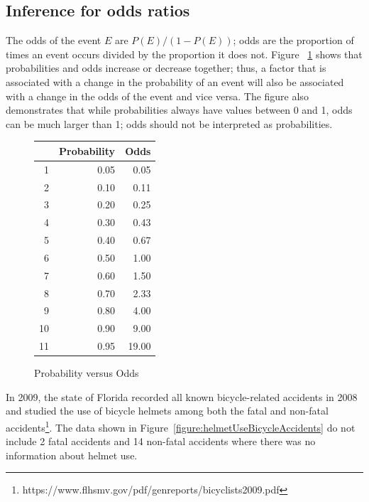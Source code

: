 \subsection{Inference for odds ratios}
\label{InferenceOddsRatios}

The odds of the event $E$ are $P(E)/(1 - P(E))$; odds are the proportion of times an event occurs divided by the proportion it does not.  Figure ~\ref{figure:probVsOdds} shows that probabilities and odds increase or decrease together; thus, a factor that is associated with a change in the probability of an event will also be associated with a change in the odds of the event and vice versa.  The figure also demonstrates that while probabilities always have values between 0 and 1, odds can be much larger than 1; odds should not be interpreted as probabilities.

\begin{figure}[ht]
\centering
\begin{tabular}{rrr}
  \hline
 & Probability & Odds \\ 
  \hline
1 & 0.05 & 0.05 \\ 
  2 & 0.10 & 0.11 \\ 
  3 & 0.20 & 0.25 \\ 
  4 & 0.30 & 0.43 \\ 
  5 & 0.40 & 0.67 \\ 
  6 & 0.50 & 1.00 \\ 
  7 & 0.60 & 1.50 \\ 
  8 & 0.70 & 2.33 \\ 
  9 & 0.80 & 4.00 \\ 
  10 & 0.90 & 9.00 \\ 
  11 & 0.95 & 19.00 \\ 
   \hline
\end{tabular}
\caption{Probability versus Odds} 
\label{figure:probVsOdds}
\end{figure}

In 2009, the state of Florida recorded all known bicycle-related accidents in 2008 and studied the use of bicycle helmets among both the fatal and non-fatal accidents\footnote{https://www.flhsmv.gov/pdf/genreports/bicyclists2009.pdf}.  The data shown in Figure~\ref{figure:helmetUseBicycleAccidents} do not include 2 fatal accidents and 14 non-fatal accidents where there was no information about helmet use.


